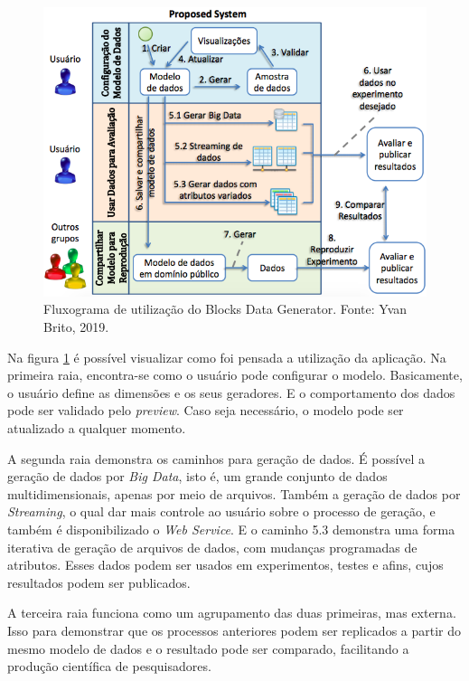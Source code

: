 \documentclass[
	12pt,				%
	openright,			%
	twoside,			%
	a4paper,			%
	english,			%
	brazil				%
	]{abntex2}
\begin{document}
	\begin{figure}[h]
		\centering
		\includegraphics[width=\linewidth]{./figures/prototipo/fluxogramaUtilizacaoBlocks.png}
		\caption{Fluxograma de utilização do Blocks Data Generator. Fonte: Yvan Brito, 2019.}
		\label{fig:fluxograma}
	\end{figure}
	\par
	Na figura \ref{fig:fluxograma} é possível visualizar como foi pensada a utilização da aplicação.
	Na primeira raia, encontra-se como o usuário pode configurar o modelo.
	Basicamente, o usuário define as dimensões e os seus geradores. 
	E o comportamento dos dados pode ser validado pelo \emph{preview}. 
	Caso seja necessário, o modelo pode ser atualizado a qualquer momento.
	\par
	A segunda raia demonstra os caminhos para geração de dados.
	É possível a geração de dados por \emph{Big Data}, isto é, um grande conjunto de dados multidimensionais, apenas por meio de arquivos.
	Também a geração de dados por \emph{Streaming}, o qual dar mais controle ao usuário sobre o processo de geração, e também é disponibilizado o \emph{Web Service}.
	E o caminho 5.3 demonstra uma forma iterativa de geração de arquivos de dados, com mudanças programadas de atributos.
	Esses dados podem ser usados em experimentos, testes e afins, cujos resultados podem ser publicados.
	\par
	A terceira raia funciona como um agrupamento das duas primeiras, mas externa.
	Isso para demonstrar que os processos anteriores podem ser replicados a partir do mesmo modelo de dados e o resultado pode ser comparado, facilitando a produção científica de pesquisadores.
	
\end{document}
